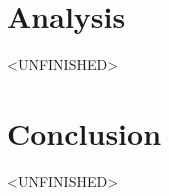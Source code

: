 \documentclass[runningheads,a4paper]{llncs}
\begin{document}
\section{Analysis}\label{sec:analysis}
<UNFINISHED>
\section{Conclusion}\label{sec:conc}
<UNFINISHED>
















\end{document}
